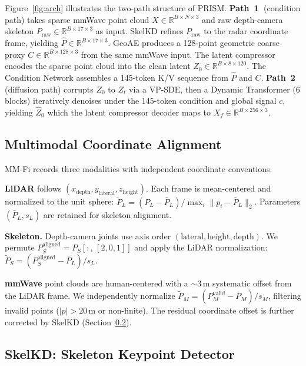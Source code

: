 \documentclass{article}
\newcommand{\Rbb}{\mathbb{R}}
\begin{document}
Figure~\ref{fig:arch} illustrates the two-path structure of PRISM.
\textbf{Path~\textcircled{1}} (condition path) takes sparse mmWave point cloud
$X\!\in\!\Rbb^{B\times N\times3}$ and raw depth-camera skeleton
$P_\text{raw}\!\in\!\Rbb^{B\times17\times3}$ as input.
SkelKD refines $P_\text{raw}$ to the radar coordinate frame, yielding
$\hat{P}\!\in\!\Rbb^{B\times17\times3}$.
GeoAE produces a 128-point geometric coarse proxy
$C\!\in\!\Rbb^{B\times128\times3}$ from the same mmWave input.
The latent compressor encodes the sparse point cloud into the clean latent
$Z_0\!\in\!\Rbb^{B\times8\times120}$.
The Condition Network assembles a 145-token K/V sequence from $\hat{P}$ and $C$.
\textbf{Path~\textcircled{2}} (diffusion path) corrupts $Z_0$ to $Z_t$ via a
VP-SDE, then a Dynamic Transformer (6 blocks) iteratively denoises under the
145-token condition and global signal $c$, yielding $\hat{Z}_0$ which the
latent compressor decoder maps to $X_f\!\in\!\Rbb^{B\times256\times3}$.

\subsection{Multimodal Coordinate Alignment}
\label{sec:align}

MM-Fi records three modalities with independent coordinate conventions.

\textbf{LiDAR} follows $(x_\text{depth}, y_\text{lateral}, z_\text{height})$.
Each frame is mean-centered and normalized to the unit sphere:
$\tilde{P}_L = (P_L - \bar{P}_L) / \max_i \|p_i - \bar{P}_L\|_2$.
Parameters $(\bar{P}_L, s_L)$ are retained for skeleton alignment.

\textbf{Skeleton.}
Depth-camera joints use axis order $(\text{lateral}, \text{height}, \text{depth})$.
We permute $P_S^{\text{aligned}} = P_S[:,\,[2,0,1]]$ and apply the LiDAR
normalization: $\tilde{P}_S = (P_S^{\text{aligned}} - \bar{P}_L) / s_L$.

\textbf{mmWave} point clouds are human-centered with a $\sim$3\,m systematic
offset from the LiDAR frame.
We independently normalize $\tilde{P}_M = (P_M^{\text{valid}} - \bar{P}_M)/s_M$,
filtering invalid points ($|p|>20$\,m or non-finite).
The residual coordinate offset is further corrected by SkelKD
(Section~\ref{sec:skelkd}).

\subsection{SkelKD: Skeleton Keypoint Detector}
\label{sec:skelkd}
\end{document}

